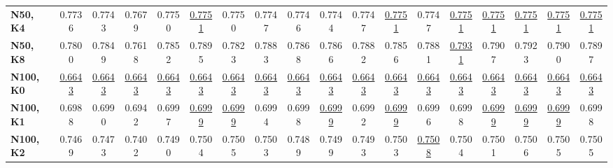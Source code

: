 \begin{table}[ht]
\begin{scriptsize}
\begin{tabular}{l | c c c c c c c c c c c c c c c c c}
\textbf{N50, K4}            & 0.7736                      & 0.7743                      & 0.7679                      & 0.7750                      & \underline{0.7751}          & 0.7750                      & 0.7747                      & 0.7746                      & 0.7744                      & 0.7747                      & \underline{0.7751}          & 0.7747                      & \underline{0.7751}          & \underline{0.7751}          & \underline{0.7751}          & \underline{0.7751}          & \underline{0.7751}         \\
\textbf{N50, K8}            & 0.7800                      & 0.7849                      & 0.7618                      & 0.7852                      & 0.7895                      & 0.7823                      & 0.7883                      & 0.7868                      & 0.7866                      & 0.7882                      & 0.7856                      & 0.7881                      & \underline{0.7931}          & 0.7907                      & 0.7923                      & 0.7900                      & 0.7897                     \\
\hline
\textbf{N100, K0}           & \underline{0.6643}          & \underline{0.6643}          & \underline{0.6643}          & \underline{0.6643}          & \underline{0.6643}          & \underline{0.6643}          & \underline{0.6643}          & \underline{0.6643}          & \underline{0.6643}          & \underline{0.6643}          & \underline{0.6643}          & \underline{0.6643}          & \underline{0.6643}          & \underline{0.6643}          & \underline{0.6643}          & \underline{0.6643}          & \underline{0.6643}         \\
\textbf{N100, K1}           & 0.6988                      & 0.6990                      & 0.6942                      & 0.6997                      & \underline{0.6999}          & \underline{0.6999}          & 0.6994                      & 0.6998                      & \underline{0.6999}          & 0.6992                      & \underline{0.6999}          & 0.6996                      & 0.6998                      & \underline{0.6999}          & \underline{0.6999}          & \underline{0.6999}          & 0.6998                     \\
\textbf{N100, K2}           & 0.7469                      & 0.7473                      & 0.7402                      & 0.7490                      & 0.7504                      & 0.7505                      & 0.7503                      & 0.7489                      & 0.7499                      & 0.7493                      & 0.7503                      & \underline{0.7508}          & 0.7504                      & 0.7501                      & 0.7506                      & 0.7505                      & 0.7505                     \\

\end{tabular}
\end{scriptsize}
\end{table}
